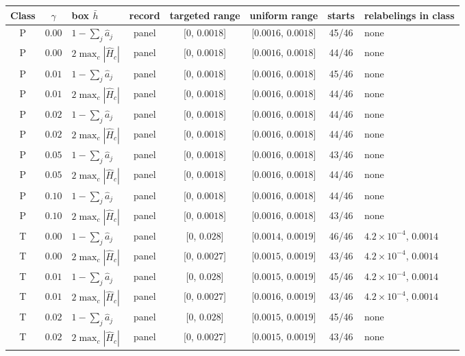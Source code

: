 \documentclass[12pt]{article}
\theoremstyle{definition}
\theoremstyle{remark}
\begin{document}
\begin{center}\footnotesize\setlength{\tabcolsep}{3pt}
\begin{tabular}{cclcccc>{\raggedright\arraybackslash}p{}}\toprule
Class & $\gamma$ & box $\bar h$ & record & targeted range & uniform range & starts & relabelings in class\\\midrule
P & $0.00$ & $1-\sum_j\hat a_j$ & panel & [$0$, $0.0018$] & [$0.0016$, $0.0018$] & 45/46 & none\\
P & $0.00$ & $2\max_c|\hat H_c|$ & panel & [$0$, $0.0018$] & [$0.0016$, $0.0018$] & 44/46 & none\\
P & $0.01$ & $1-\sum_j\hat a_j$ & panel & [$0$, $0.0018$] & [$0.0016$, $0.0018$] & 45/46 & none\\
P & $0.01$ & $2\max_c|\hat H_c|$ & panel & [$0$, $0.0018$] & [$0.0016$, $0.0018$] & 44/46 & none\\
P & $0.02$ & $1-\sum_j\hat a_j$ & panel & [$0$, $0.0018$] & [$0.0016$, $0.0018$] & 44/46 & none\\
P & $0.02$ & $2\max_c|\hat H_c|$ & panel & [$0$, $0.0018$] & [$0.0016$, $0.0018$] & 44/46 & none\\
P & $0.05$ & $1-\sum_j\hat a_j$ & panel & [$0$, $0.0018$] & [$0.0016$, $0.0018$] & 43/46 & none\\
P & $0.05$ & $2\max_c|\hat H_c|$ & panel & [$0$, $0.0018$] & [$0.0016$, $0.0018$] & 44/46 & none\\
P & $0.10$ & $1-\sum_j\hat a_j$ & panel & [$0$, $0.0018$] & [$0.0016$, $0.0018$] & 44/46 & none\\
P & $0.10$ & $2\max_c|\hat H_c|$ & panel & [$0$, $0.0018$] & [$0.0016$, $0.0018$] & 43/46 & none\\
T & $0.00$ & $1-\sum_j\hat a_j$ & panel & [$0$, $0.028$] & [$0.0014$, $0.0019$] & 46/46 & $4.2\times10^{-4}$, $0.0014$\\
T & $0.00$ & $2\max_c|\hat H_c|$ & panel & [$0$, $0.0027$] & [$0.0015$, $0.0019$] & 43/46 & $4.2\times10^{-4}$, $0.0014$\\
T & $0.01$ & $1-\sum_j\hat a_j$ & panel & [$0$, $0.028$] & [$0.0015$, $0.0019$] & 45/46 & $4.2\times10^{-4}$, $0.0014$\\
T & $0.01$ & $2\max_c|\hat H_c|$ & panel & [$0$, $0.0027$] & [$0.0016$, $0.0019$] & 43/46 & $4.2\times10^{-4}$, $0.0014$\\
T & $0.02$ & $1-\sum_j\hat a_j$ & panel & [$0$, $0.028$] & [$0.0015$, $0.0019$] & 45/46 & none\\
T & $0.02$ & $2\max_c|\hat H_c|$ & panel & [$0$, $0.0027$] & [$0.0015$, $0.0019$] & 43/46 & none\\

\end{tabular}
\end{center}
\end{document}
